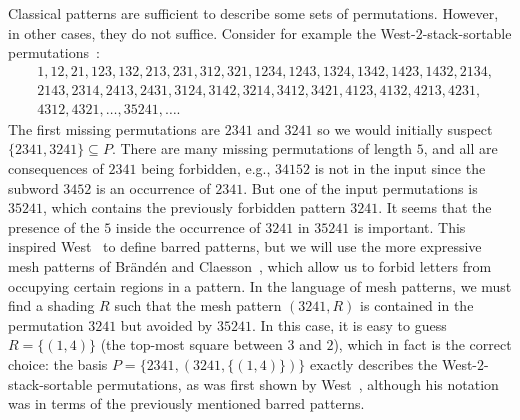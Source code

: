 \documentclass[a4paper]{article}
\begin{document}
Classical patterns are sufficient to describe some sets of permutations. However, in other
cases, they do not suffice. Consider for example the West-$2$-stack-sortable permutations~\cite{W90}:
\begin{align*}
   & 1,
  12,
  21,
  123,
  132,
  213,
  231,
  312,
  321,
  1234,
  1243,
  1324,
  1342,
  1423,
  1432,
  2134,    \\
   & 2143,
  2314,
  2413,
  2431,
  3124,
  3142,
  3214,
  3412,
  3421,
  4123,
  4132,
  4213,
  4231,    \\
   & 4312,
  4321, \dotsc,
  35241, \dotsc.
\end{align*}
The first missing permutations are $2341$ and $3241$ so we would initially suspect
$\{2341,3241\} \subseteq P$. There are many missing permutations of length $5$, and all are consequences of $2341$ being forbidden, e.g., $34152$ is not in the
input since the subword $3452$ is an occurrence of $2341$. But one of the input
permutations is $35241$, which contains the previously forbidden pattern
$3241$. It seems that the presence of the $5$ inside the occurrence of $3241$
in $35241$ is important. This inspired West~\cite{W90} to define barred patterns,
but we will use the more expressive mesh patterns of Br\"and\'en and Claesson~\cite{BC},
which allow us to forbid letters from occupying certain regions in a pattern.
In the language of mesh patterns, we must find a shading $R$ such that the mesh pattern $(3241, R)$ is contained
in the permutation $3241$ but avoided by $35241$. In this case, it is easy to
guess $R = \{(1,4)\}$ (the top-most square between $3$ and $2$), which in fact
is the correct choice: the basis $P = \{2341, (3241,\{(1,4)\})\}$ exactly
describes the West-$2$-stack-sortable permutations, as was first shown by West~\cite{W90},
although his notation was in terms of the previously mentioned barred patterns.
\end{document}
